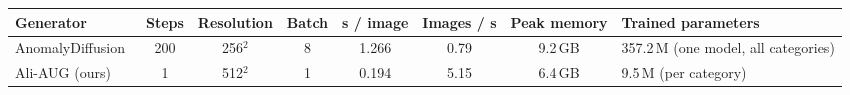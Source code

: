 \begin{tabular}{@{}l c c c c c c l@{}}
\toprule
Generator & Steps & Resolution & Batch & s / image & Images / s & Peak memory & Trained parameters \\
\midrule
AnomalyDiffusion~\cite{hu2024anomalydiffusionfewshotanomalyimage} & 200 & 256$^2$ & 8 & 1.266 & 0.79 & 9.2\,GB & 357.2\,M (one model, all categories) \\
Ali-AUG (ours) & 1 & 512$^2$ & 1 & 0.194 & 5.15 & 6.4\,GB & 9.5\,M (per category) \\
\bottomrule
\end{tabular}
